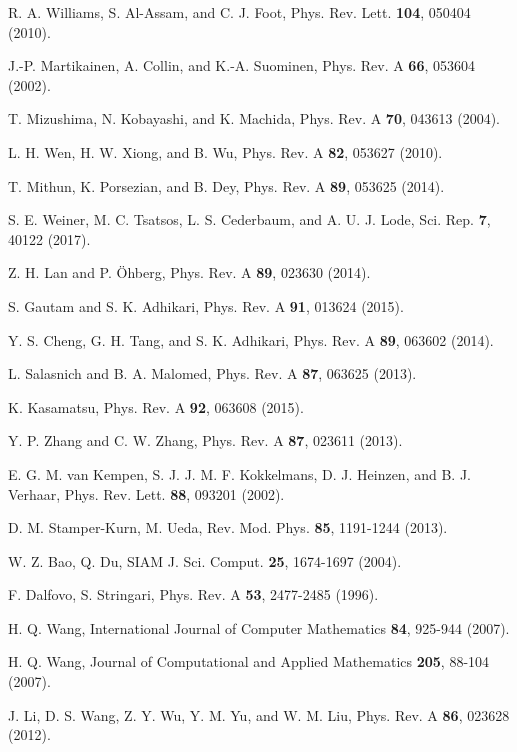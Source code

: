 \documentclass[aps,pra,showpacs,twocolumn,superscriptaddress]{revtex4-1}
\begin{document}
\begin{thebibliography}{99}
R. A. Williams, S. Al-Assam, and C. J. Foot,
Phys. Rev. Lett. \textbf{104}, 050404 (2010).

J.-P. Martikainen, A. Collin, and K.-A. Suominen,
Phys. Rev. A \textbf{66}, 053604 (2002).

T. Mizushima, N. Kobayashi, and K. Machida,
Phys. Rev. A \textbf{70}, 043613 (2004).

L. H. Wen,  H. W. Xiong, and B. Wu,
Phys. Rev. A \textbf{82}, 053627 (2010).

T. Mithun, K. Porsezian, and B. Dey,
Phys. Rev. A \textbf{89}, 053625 (2014).

S. E. Weiner, M. C. Tsatsos, L. S. Cederbaum, and A. U. J. Lode,
Sci. Rep. \textbf{7}, 40122 (2017).

Z. H. Lan and P. \"{O}hberg,
Phys. Rev. A \textbf{89}, 023630 (2014).

S. Gautam and S. K. Adhikari,
Phys. Rev. A \textbf{91}, 013624 (2015).

Y. S. Cheng, G. H. Tang, and S. K. Adhikari,
Phys. Rev. A \textbf{89}, 063602 (2014).

L. Salasnich and B. A. Malomed,
Phys. Rev. A \textbf{87}, 063625 (2013).

K. Kasamatsu,
Phys. Rev. A \textbf{92}, 063608 (2015).

Y. P. Zhang and C. W. Zhang,
Phys. Rev. A \textbf{87}, 023611 (2013).

E. G. M. van Kempen, S. J. J. M. F. Kokkelmans, D. J. Heinzen, and B. J. Verhaar,
Phys. Rev. Lett. \textbf{88}, 093201 (2002).

D. M. Stamper-Kurn, M. Ueda,
Rev. Mod. Phys. \textbf{85}, 1191-1244 (2013).

W. Z. Bao, Q. Du,
SIAM J. Sci. Comput. \textbf{25}, 1674-1697 (2004).

F. Dalfovo, S. Stringari,
Phys. Rev. A \textbf{53}, 2477-2485 (1996).

H. Q. Wang,
International Journal of Computer Mathematics \textbf{84}, 925-944 (2007).

H. Q. Wang,
Journal of Computational and Applied Mathematics \textbf{205}, 88-104 (2007).

J. Li, D. S. Wang, Z. Y. Wu, Y. M. Yu, and W. M. Liu,
Phys. Rev. A \textbf{86}, 023628 (2012).


\end{thebibliography}
\end{document}

